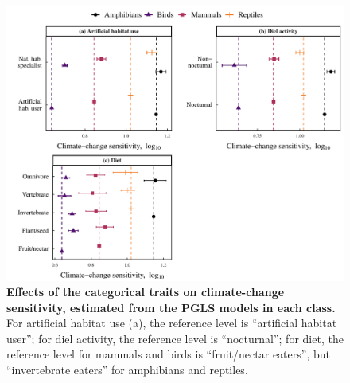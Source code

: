 \begin{figure}[h!]
\centering
\includegraphics[scale=0.7]{figures/Chapter4/Figure5}
\caption[Effects of the categorical traits on climate-change sensitivity, estimated from the PGLS models in each class.]{\textbf{Effects of the categorical traits on climate-change sensitivity, estimated from the PGLS models in each class.} For artificial habitat use (a), the reference level is “artificial habitat user”; for diel activity, the reference level is “nocturnal”; for diet, the reference level for mammals and birds is “fruit/nectar eaters”, but “invertebrate eaters” for amphibians and reptiles. }
\label{chap4_fig5}
\end{figure}



